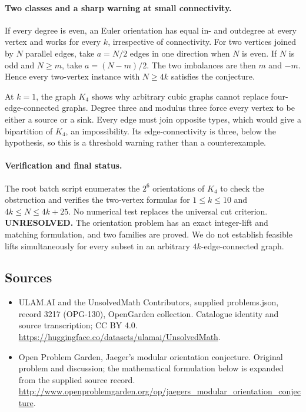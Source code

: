 \documentclass[11pt,a4paper]{article}
\begin{document}
\paragraph{Two classes and a sharp warning at small connectivity.}
If every degree is even, an Euler orientation has equal in- and outdegree
at every vertex and works for every $k$, irrespective of connectivity.
For two vertices joined by $N$ parallel edges, take $a=N/2$ edges in one
direction when $N$ is even. If $N$ is odd and $N\ge m$, take
$a=(N-m)/2$. The two imbalances are then $m$ and $-m$. Hence every
two-vertex instance with $N\ge4k$ satisfies the conjecture.

At $k=1$, the graph $K_4$ shows why arbitrary cubic graphs cannot replace
four-edge-connected graphs. Degree three and modulus three force every
vertex to be either a source or a sink. Every edge must join opposite
types, which would give a bipartition of $K_4$, an impossibility.
Its edge-connectivity is three, below the hypothesis, so this is a
threshold warning rather than a counterexample.

\paragraph{Verification and final status.}
The root batch script enumerates the $2^6$ orientations of $K_4$ to check
the obstruction and verifies the two-vertex formulas for $1\le k\le10$
and $4k\le N\le4k+25$. No numerical test replaces the universal cut
criterion. \textbf{UNRESOLVED.} The orientation problem has an exact
integer-lift and matching formulation, and two families are proved.
We do not establish feasible lifts simultaneously for every subset in
an arbitrary $4k$-edge-connected graph.

\subsection{Sources}
\begin{itemize}
\item[S1] ULAM.AI and the UnsolvedMath Contributors, supplied problems.json, record 3217 (OPG-130), OpenGarden collection. Catalogue identity and source transcription; CC BY 4.0.
\url{https://huggingface.co/datasets/ulamai/UnsolvedMath}.
\item[S2] Open Problem Garden, Jaeger's modular orientation conjecture. Original problem and discussion; the mathematical formulation below is expanded from the supplied source record.
\url{http://www.openproblemgarden.org/op/jaegers_modular_orientation_conjecture}.

\end{itemize}
\end{document}
